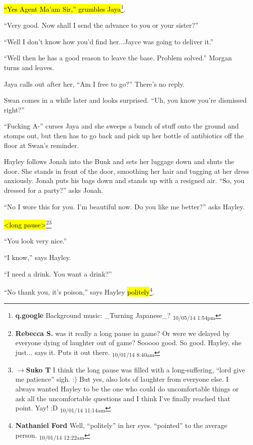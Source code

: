 \hl{``Yes Agent Ma'am Sir,'' grumbles Jaya}\footnote{\textbf{q.google }Background music: \_Turning Japanese\_? \textsubscript{10/05/14 1:54pm}}.

``Very good.  Now shall I send the advance to you or your sister?''

``Well I don't know how you'd find her...Jayce was going to deliver it.''

``Well then he has a good reason to leave the base.  Problem solved.'' Morgan turns and leaves.

Jaya calls out after her, ``Am I free to go?''  There's no reply.



Swan comes in a while later and looks surprised.  ``Uh, you know you're dismissed right?''

``Fucking A-'' curses Jaya and she sweeps a bunch of stuff onto the ground and stomps out, but then has to go back and pick up her bottle of antibiotics off the floor at Swan's reminder.





Hayley follows Jonah into the Bunk and sets her luggage down and shuts the door.  She stands in front of the door, smoothing her hair and tugging at her dress anxiously.  Jonah puts his bags down and stands up with a resigned air.  ``So, you dressed for a party?'' asks Jonah.

``No I wore this for you.  I'm beautiful now.  Do you like me better?'' asks Hayley.

\hl{\textless long pause\textgreater }\footnote{\textbf{Rebecca S. }was it really a long pause in game?  Or were we delayed by everyone dying of laughter out of game?  Sooooo good. So good.  Hayley, she just... says it. Puts it out there. \textsubscript{10/01/14 8:40am}}\footnote{$\rightarrow$\textbf{Suko T }I think the long pause was filled with a long-suffering, ``lord give me patience'' sigh. :)  But yes, also lots of laughter from everyone else.  I always wanted Hayley to be the one who could do uncomfortable things or ask all the uncomfortable questions and I think I've finally reached that point.  Yay! :D \textsubscript{10/01/14 11:14am}}

``You look very nice.''

``I know,'' says Hayley.

``I need a drink.  You want a drink?''

``No thank you, it's poison,'' says Hayley \hl{politely}\footnote{\textbf{Nathaniel Ford }Well, ``politely'' in her eyes. ``pointed'' to the average person. \textsubscript{10/01/14 12:22am}}.

